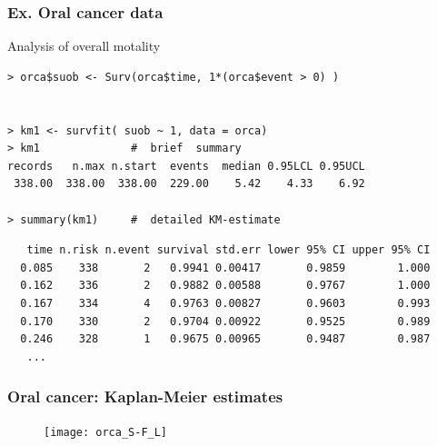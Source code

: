 \documentclass[handout,12pt]{beamer}
\begin{document}
\begin{frame}[fragile]
\frametitle{Ex. Oral cancer data }

Analysis of overall motality

\small
\begin{verbatim}
> orca$suob <- Surv(orca$time, 1*(orca$event > 0) )


> km1 <- survfit( suob ~ 1, data = orca)
> km1              #  brief  summary
records   n.max n.start  events  median 0.95LCL 0.95UCL 
 338.00  338.00  338.00  229.00    5.42    4.33    6.92 
 
> summary(km1)     #  detailed KM-estimate
\end{verbatim}
\scriptsize
\begin{verbatim}
   time n.risk n.event survival std.err lower 95% CI upper 95% CI
  0.085    338       2   0.9941 0.00417       0.9859        1.000
  0.162    336       2   0.9882 0.00588       0.9767        1.000
  0.167    334       4   0.9763 0.00827       0.9603        0.993
  0.170    330       2   0.9704 0.00922       0.9525        0.989
  0.246    328       1   0.9675 0.00965       0.9487        0.987
   ...  
\end{verbatim}

\normalsize

\end{frame}


\begin{frame}
\frametitle{Oral cancer: Kaplan-Meier estimates}

\begin{figure}
\centering
\texttt{[image: orca\_S-F\_L]} 
\end{figure}

\end{frame}

%
%
\end{document}
